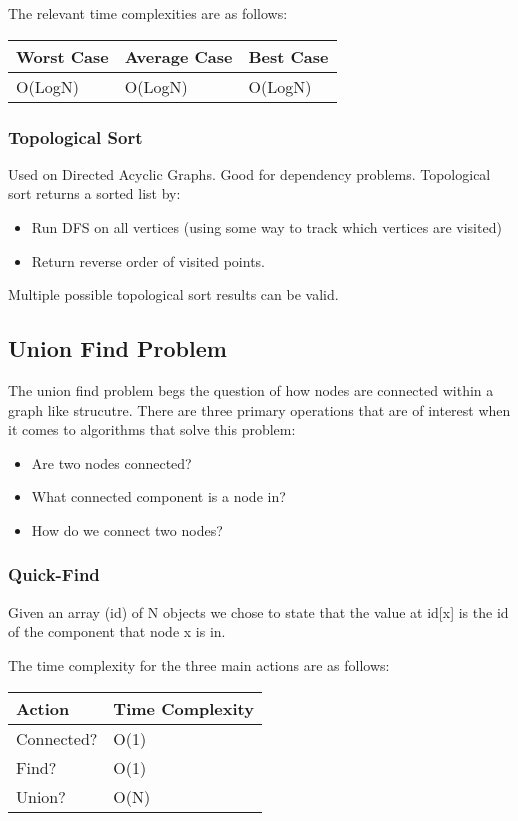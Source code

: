 \documentclass[11pt]{article}
\begin{document}
The relevant time complexities are as follows:
\begin{center}
\begin{tabular}{lll}
Worst Case & Average Case & Best Case\\
\hline
O(LogN) & O(LogN) & O(LogN)\\
\end{tabular}
\end{center}
\subsubsection*{Topological Sort}
\label{sec:org9193058}
Used on Directed Acyclic Graphs.
Good for dependency problems.
Topological sort returns a sorted list by:
\begin{itemize}
\item Run DFS on all vertices (using some way to track which vertices are visited)
\item Return reverse order of visited points.
\end{itemize}

Multiple possible topological sort results can be valid.


\subsection*{Union Find Problem}
\label{sec:org8e18f55}
The union find problem begs the question of how nodes are connected within a graph like strucutre.
There are three primary operations that are of interest when it comes to algorithms that solve this problem:
\begin{itemize}
\item Are two nodes connected?
\item What connected component is a node in?
\item How do we connect two nodes?
\end{itemize}

\subsubsection*{Quick-Find}
\label{sec:orga2ee200}
Given an array (id) of N objects we chose to state that the value at id[x] is the id of the component that node x is in.

The time complexity for the three main actions are as follows:
\begin{center}
\begin{tabular}{ll}
Action & Time Complexity\\
\hline
Connected? & O(1)\\
Find? & O(1)\\
Union? & O(N)\\
\end{tabular}
\end{center}
\end{document}
